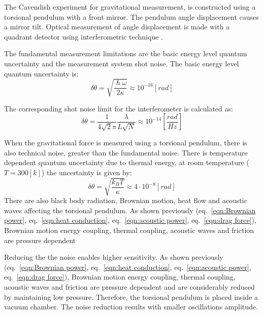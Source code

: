 \documentclass[\main/master.tex]{subfiles}
\begin{document}
 
 
 
 









The Cavendish experiment for gravitational measurement, is constructed using a torsional pendulum with a front mirror. The pendulum angle displacement causes a mirror tilt. Optical measurement of angle displacement is made with a quadrant detector using interferometric technique \cite{howell2019}.
\par\noindent
The fundamental measurement limitations are the basic energy level quantum uncertainty and the measurement system shot noise. The basic energy level quantum uncertainty is:
\begin{equation}
\delta\theta= \sqrt{\frac{\hslash\omega}{2\kappa}} \approx 10^{-16} [rad]    \label{eqn:basic uncertainty}
\end{equation}
\par\noindent
The corresponding shot noise limit for the interferometer is calculated as:
\begin{equation}
\delta\theta = \frac{1}{4\sqrt{2}\pi}\frac{\lambda}{L\sqrt{N}} \approx
10^{-14} [\frac{rad}{Hz}]    \label{eqn:shot limit}
\end{equation}
\par\noindent
When the gravitational force is measured using a torsional pendulum, there is also technical noise, greater than the fundamental noise. There is temperature dependent quantum uncertainty due to thermal energy, at room temperature ($T = 300[k]$) the uncertainty is given by:
\begin{equation}
\delta\theta = \sqrt{\frac{k_B T}{\kappa}} \approx 4\cdot 10^{-8} [rad] \label{eqn:Brownian uncertainty 3}
\end{equation}
There are also black body radiation, Brownian motion, heat flow and acoustic waves affecting the torsional pendulum. As shown previously (eq.~\ref{eqn:Brownian power}, eq.~\ref{eqn:heat conduction}, eq.~\ref{eqn:acoustic power}, eq.~\ref{eqn:drag force}), Brownian motion energy coupling, thermal coupling, acoustic waves and friction are pressure dependent
\par\noindent 
Reducing the the noise enables higher sensitivity. As shown previously (eq.~\ref{eqn:Brownian power}, eq.~\ref{eqn:heat conduction}, eq.~\ref{eqn:acoustic power}, eq.~\ref{eqn:drag force}), Brownian motion energy coupling, thermal coupling, acoustic waves and friction are pressure dependent and are considerably reduced by maintaining low pressure. Therefore, the torsional pendulum is placed inside a vacuum chamber. The noise reduction results with smaller oscillations amplitude.
\end{document}
